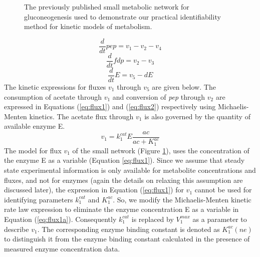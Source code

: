 \documentclass[10pt]{article}
\begin{document}
\begin{figure}[!tbhp]
	\caption{The previously published small metabolic network for gluconeogenesis used to demonstrate our practical identifiability method for kinetic models of metabolism.}\label{fig:network}
\end{figure}		

\begin{equation}\label{eq:ode1}
\frac{d}{dt}pep=v_1-v_2-v_4
\end{equation}
\begin{equation}\label{eq:ode2}
\frac{d}{dt}fdp=v_2-v_3
\end{equation}
\begin{equation}\label{eq:ode3}
\frac{d}{dt}E=v_5 - d E
\end{equation}
The kinetic expressions for fluxes $v_1$ through $v_5$ are given below. The consumption of acetate through $v_1$ and conversion of \textit{pep} through $v_2$ are expressed in Equations (\ref{eq:flux1}) and (\ref{eq:flux2}) respectively using Michaelis-Menten kinetics. The acetate flux through $v_1$ is also governed by the quantity of available enzyme E. 
\begin{equation}\label{eq:flux1}
v_1 = k_{1}^{cat}E\frac{ac}{ac+K_{1}^{ac}}
\end{equation}		
The model for flux $v_1$ of the small network (Figure \ref{fig:network}), uses the concentration of the enzyme E as a variable (Equation \ref{eq:flux1}). Since we assume that steady state experimental information is only available for metabolite concentrations and fluxes, and not for enzymes (again the details on relaxing this assumption are discussed later), the expression in Equation (\ref{eq:flux1}) for $v_1$ cannot be used for identifying parameters $k_1^{cat}$ and $K_1^{ac}$. So, we modify the Michaelis-Menten kinetic rate law expression to eliminate the enzyme concentration E as a variable in Equation (\ref{eq:flux1a}). Consequently $k_1^{cat}$ is replaced by $V_1^{max}$ as a parameter to describe $v_1$. The corresponding enzyme binding constant is denoted as $K_1^{ac} (ne)$ to distinguish it from the enzyme binding constant calculated in the presence of measured enzyme concentration data.
\end{document}
